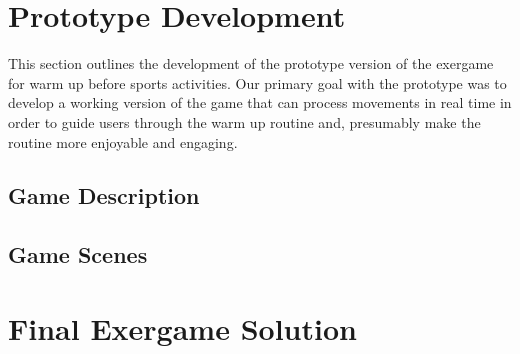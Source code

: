 \section{Prototype Development}
This section outlines the development of the prototype version of the exergame for warm up before sports activities. Our primary goal with the prototype was to develop a working version of the game that can process movements in real time in order to guide users through the warm up routine and, presumably make the routine more enjoyable and engaging.

\subsection{Game Description}
\subsection{Game Scenes}
\section{Final Exergame Solution}